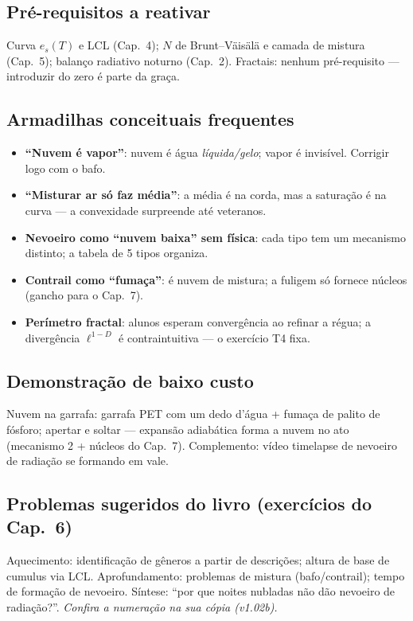\subsection*{Pré-requisitos a reativar}

Curva $e_s(T)$ e LCL (Cap.~4); $N$ de Brunt--Väisälä e camada de mistura
(Cap.~5); balanço radiativo noturno (Cap.~2). Fractais: nenhum
pré-requisito — introduzir do zero é parte da graça.

\subsection*{Armadilhas conceituais frequentes}

\begin{itemize}
  \item \textbf{``Nuvem é vapor''}: nuvem é água \emph{líquida/gelo};
        vapor é invisível. Corrigir logo com o bafo.
  \item \textbf{``Misturar ar só faz média''}: a média é na corda, mas a
        saturação é na curva — a convexidade surpreende até veteranos.
  \item \textbf{Nevoeiro como ``nuvem baixa'' sem física}: cada tipo tem um
        mecanismo distinto; a tabela de 5 tipos organiza.
  \item \textbf{Contrail como ``fumaça''}: é nuvem de mistura; a fuligem só
        fornece núcleos (gancho para o Cap.~7).
  \item \textbf{Perímetro fractal}: alunos esperam convergência ao refinar
        a régua; a divergência $\ell^{1-D}$ é contraintuitiva — o exercício
        T4 fixa.
\end{itemize}

\subsection*{Demonstração de baixo custo}

Nuvem na garrafa: garrafa PET com um dedo d'água + fumaça de palito de
fósforo; apertar e soltar — expansão adiabática forma a nuvem no ato
(mecanismo 2 + núcleos do Cap.~7). Complemento: vídeo timelapse de nevoeiro
de radiação se formando em vale.

\subsection*{Problemas sugeridos do livro (exercícios do Cap.~6)}

Aquecimento: identificação de gêneros a partir de descrições; altura de
base de cumulus via LCL. Aprofundamento: problemas de mistura
(bafo/contrail); tempo de formação de nevoeiro. Síntese: ``por que noites
nubladas não dão nevoeiro de radiação?''.
\emph{Confira a numeração na sua cópia (v1.02b).}

